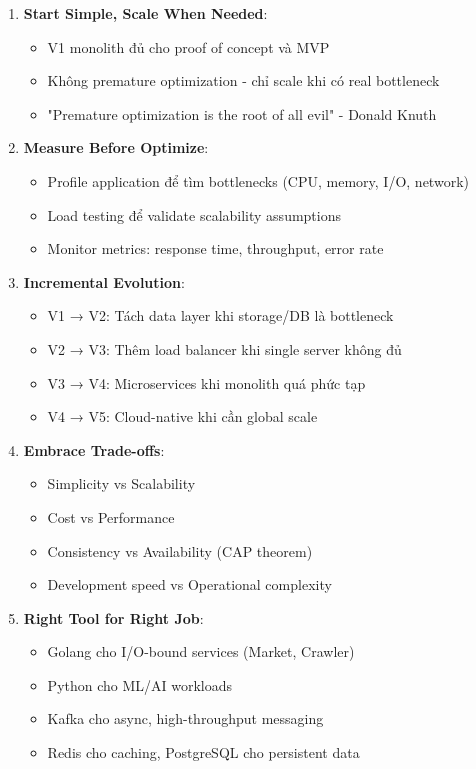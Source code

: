 \begin{enumerate}
    \item \textbf{Start Simple, Scale When Needed}:
    \begin{itemize}
        \item V1 monolith đủ cho proof of concept và MVP
        \item Không premature optimization - chỉ scale khi có real bottleneck
        \item "Premature optimization is the root of all evil" - Donald Knuth
    \end{itemize}
    
    \item \textbf{Measure Before Optimize}:
    \begin{itemize}
        \item Profile application để tìm bottlenecks (CPU, memory, I/O, network)
        \item Load testing để validate scalability assumptions
        \item Monitor metrics: response time, throughput, error rate
    \end{itemize}
    
    \item \textbf{Incremental Evolution}:
    \begin{itemize}
        \item V1 → V2: Tách data layer khi storage/DB là bottleneck
        \item V2 → V3: Thêm load balancer khi single server không đủ
        \item V3 → V4: Microservices khi monolith quá phức tạp
        \item V4 → V5: Cloud-native khi cần global scale
    \end{itemize}
    
    \item \textbf{Embrace Trade-offs}:
    \begin{itemize}
        \item Simplicity vs Scalability
        \item Cost vs Performance
        \item Consistency vs Availability (CAP theorem)
        \item Development speed vs Operational complexity
    \end{itemize}
    
    \item \textbf{Right Tool for Right Job}:
    \begin{itemize}
        \item Golang cho I/O-bound services (Market, Crawler)
        \item Python cho ML/AI workloads
        \item Kafka cho async, high-throughput messaging
        \item Redis cho caching, PostgreSQL cho persistent data
    \end{itemize}
\end{enumerate}

